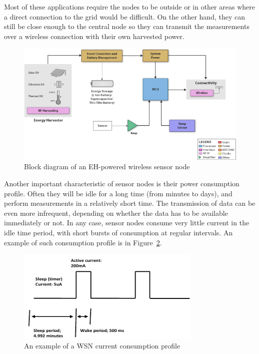 \documentclass[a4paper,10pt]{article}
\begin{document}
Most of these applications require the nodes to be outside or in other areas where a direct connection to the grid would be difficult. On the other hand, they can still be close enough to the central node so they can transmit the measurements over a wireless connection with their own harvested power. 

\begin{figure}[h]
 \centering
\includegraphics[width=.9\textwidth]{./Slike/EH-Block}
\caption{Block diagram of an \ac{EH}-powered wireless sensor node~\cite{ti:eh}}
\label{fig:block-sensor}
\end{figure}

Another important characteristic of sensor nodes is their power consumption profile. Often they will be idle for a long time (from minutes to days), and perform measurements in a relatively short time. The transmission of data can be even more infrequent, depending on whether the data has to be available immediately or not. In any case, sensor nodes consume very little current in the idle time period, with short bursts of consumption at regular intervals. An example of such consumption profile is in Figure~\ref{fig:wsn-consumption}. 

\begin{figure}[h]
\centering
 \includegraphics[width=250pt]{./Slike/wsn-current-profile}
 \caption{An example of a \ac{WSN} current consumption profile~\cite{cap-wsn-ieee}}
\label{fig:wsn-consumption}
\end{figure}
\end{document}
